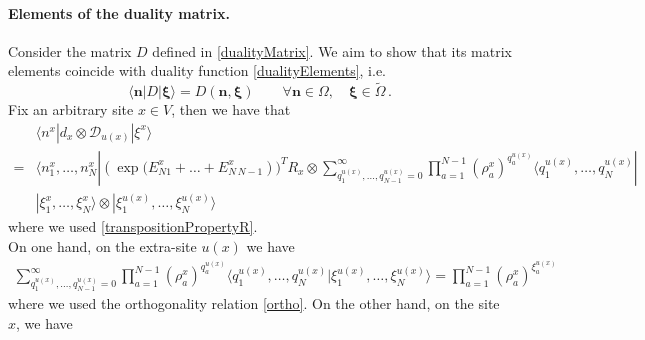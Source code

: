 \documentclass[10pt]{article}
\numberwithin{equation}{section}
\numberwithin{equation}{subsection}
\newcommand{\dd}{\mathcal{D}_{u(x)}}
\begin{document}
\paragraph{Elements of the duality matrix.}
Consider the matrix $D$ defined in \eqref{dualityMatrix}.
We aim to show that its matrix elements coincide with duality function \eqref{dualityElements}, i.e.
\begin{equation}\label{proofDualityElements}
\langle \bm{n}|D|\bm{\xi}\rangle=D(\bm{n},\bm{\xi})\qquad   \forall \bm{n}\in \Omega,\quad \bm{\xi}\in \widetilde{\Omega}\,.
\end{equation}
Fix an arbitrary site $x\in V$, then we have that 
\begin{align*}
	 &\langle n^{x}|d_{x}\otimes \dd|\xi^{x}\rangle\\=&\langle n_{1}^{x},\ldots,n_{N}^{x}| (\exp{(E_{N1}^{x}+\ldots+E_{N\,N-1}^{x}}))^{T}R_{x}\otimes\sum_{q_{1}^{u(x)},\ldots,q_{N-1}^{u(x)}=0}^{\infty}\prod_{a=1}^{N-1}\left(\rho_{a}^{x}\right)^{q_{a}^{u(x)}}\langle q_{1}^{u(x)},\ldots,q_{N}^{u(x)}|
	 \\&|\xi_{1}^{x},\ldots,\xi_{N}^{x}\rangle \otimes |\xi_{1}^{u(x)},\ldots,\xi_{N}^{u(x)}\rangle
\end{align*}
where we used \eqref{transpositionPropertyR}. \\
On one hand, on the extra-site $u(x)$ we have 
\begin{align*}
\sum_{q_{1}^{u(x)},\ldots,q_{N-1}^{u(x)}=0}^{\infty}\prod_{a=1}^{N-1}\left(\rho_{a}^{x}\right)^{q_{a}^{u(x)}}\langle q_{1}^{u(x)},\ldots,q_{N}^{u(x)}|\xi_{1}^{u(x)},\ldots,\xi_{N}^{u(x)}\rangle=\prod_{a=1}^{N-1}\left(\rho_{a}^{x}\right)^{\xi_{a}^{u(x)}}
\end{align*}
where  we used the orthogonality relation \eqref{ortho}. 
On the other hand, on the site $x$, we have 
\end{document}
